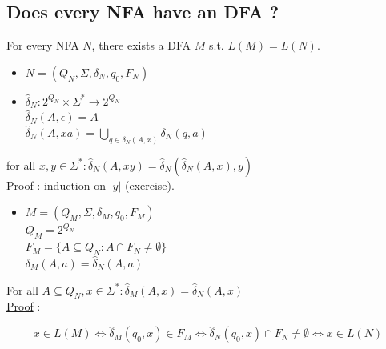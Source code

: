 \documentclass[12pt,a4paper]{article}
\newcommand{\<}{\langle}
\renewcommand{\>}{\rangle}
\begin{document}
\subsection{Does every NFA have an DFA ?}
\begin{boite}
     For every NFA $N$, there exists a DFA $M$ s.t. $L(M) = L(N)$.
\end{boite}
\begin{itemize}
    \item     $N = (Q_N, \Sigma, \delta_N, q_0, F_N)$
    \item     $\hat{\delta}_N : 2^{Q_N} \times \Sigma^* \to 2^{Q_N}$\\
              $\hat{\delta}_N(A,\epsilon) = A$\\
              $\hat{\delta}_N(A,xa) = \bigcup_{q \in\delta_N(A,x)}\delta_N(q,a)$ 
\end{itemize}
\begin{blackbox}[0.75]
 for all $x,y \in \Sigma^* : \hat{\delta}_N(A,xy) = \hat{\delta}_N (\hat{\delta}_N(A,x),y)$\\
\uline{Proof :} induction on $|y|$ (exercise).
\end{blackbox}
\begin{itemize}
    \item     $M = (Q_M, \Sigma, \delta_M, q_0, F_M)$\\
              $Q_M = 2^{Q_N}$\\
              $F_M = \{A \subseteq Q_N : A \cap F_N \neq \emptyset\}$\\
              $\delta_M(A,a) = \hat{\delta}_N(A,a)$
\end{itemize}
\begin{blackbox}[0.73]
     For all $A \subseteq Q_N, x \in \Sigma^* : \hat{\delta}_M(A,x) = \hat{\delta}_N(A,x)$ \\
    \uline{Proof} : %
\end{blackbox}
 \[x \in L(M) \iff \hat{\delta}_M(q_0, x) \in F_M \iff \hat{\delta}_N(q_0,x) \cap F_N \neq \emptyset \iff x \in L(N)\]
\end{document}
